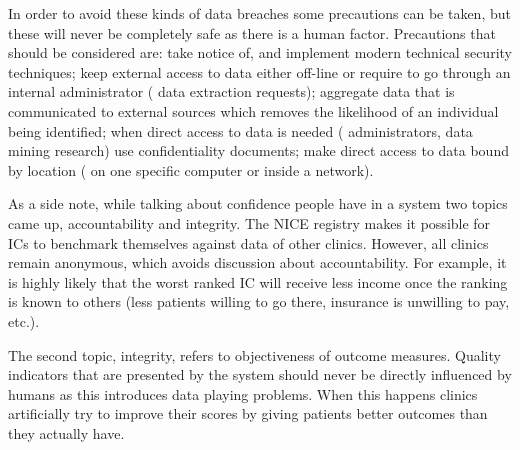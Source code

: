 In order to avoid these kinds of data breaches some precautions can be taken, but these will never be completely safe as there is a human factor.
Precautions that should be considered are: take notice of, and implement modern technical security techniques; keep external access to data either off-line or require to go through an internal administrator (\eg{} data extraction requests); aggregate data that is communicated to external sources which removes the likelihood of an individual being identified; when direct access to data is needed (\eg{} administrators, data mining research) use confidentiality documents; make direct access to data bound by location (\eg{} on one specific computer or inside a network).

As a side note, while talking about confidence people have in a system two topics came up, accountability and integrity.
The NICE registry makes it possible for ICs to benchmark themselves against data of other clinics.
However, all clinics remain anonymous, which avoids discussion about accountability. 
For example, it is highly likely that the worst ranked IC will receive less income once the ranking is known to others (less patients willing to go there, insurance is unwilling to pay, etc.).

The second topic, integrity, refers to objectiveness of outcome measures.
Quality indicators that are presented by the system should never be directly influenced by humans as this introduces data playing problems. 
When this happens clinics artificially try to improve their scores by giving patients better outcomes than they actually have.